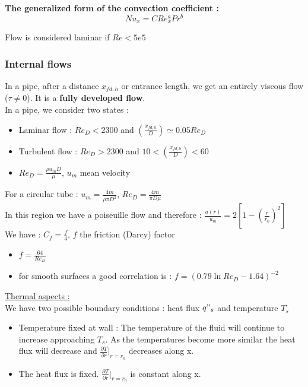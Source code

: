 \documentclass[../main.tex]{subfiles}
\begin{document}
\textbf{The generalized form of the convection coefficient : } \begin{equation}
    Nu_x = CRe_x^a Pr^b
\end{equation}

\warning Flow is considered laminar if $Re < 5e5$\\



\subsubsection{Internal flows}
In a pipe, after a distance $x_{fd,h}$ or entrance length, we get an entirely viscous flow ($\tau \neq 0$). It is a \textbf{fully developed flow}.\\

In a pipe, we consider two states : \begin{itemize}
    \item Laminar flow : $Re_D<2300$ and $(\frac{x_{fd,h}}{D}) \simeq 0.05 Re_D$\\
    \item Turbulent flow : $Re_D>2300$ and $10<(\frac{x_{fd,h}}{D})<60$ \\
    \item $Re_D = \frac{\rho u_m D}{\mu}$, $u_m$ mean velocity\\
\end{itemize}

For a circular tube : $u_m = \frac{4\dot{m}}{\rho \pi D^2}$, $Re_D = \frac{4\dot{m}}{\pi D\mu}$\\

In this region we have a poiseuille flow and therefore : $\frac{u(r)}{u_m} = 2[1-(\frac{r}{r_0})^2]$\\
We have : $C_f = \frac{f}{4}$, $f$ the friction (Darcy) factor\\
\begin{itemize}
    \item $f = \frac{64}{Re_D}$\\
    \item for smooth surfaces a good correlation is : $f = (0.79 \ln Re_D-1.64)^{-2}$\\
\end{itemize}

\quad \underline{Thermal aspects :}\\
We have two possible boundary conditions : heat flux $q"_s$ and temperature $T_s$\\

\begin{itemize}
    \item Temperature fixed at wall : The temperature of the fluid will continue to increase approaching $T_s$. As the temperatures become more similar the heat flux will decrease and $\frac{\partial T}{\partial r}\lvert_{r=r_0}$ decreases along x.\\
    \item The heat flux is fixed. $\frac{\partial T}{\partial r}\lvert_{r=r_0}$ is constant along x. \\
\end{itemize}
\end{document}
